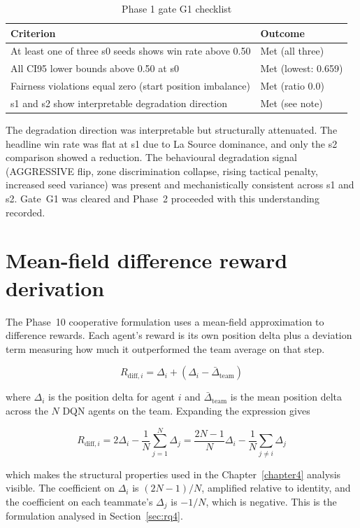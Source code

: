 \begin{appendices}
\begin{table}[htbp]
\centering
\small
\caption{Phase 1 gate G1 checklist}
\label{tab:phase1-gate}
\begin{tabular}{|p{8.5cm}|p{2.0cm}|}
\hline
\textbf{Criterion} & \textbf{Outcome} \\
\hline
At least one of three s0 seeds shows win rate above 0.50 & Met (all three) \\
All CI95 lower bounds above 0.50 at s0 & Met (lowest: 0.659) \\
Fairness violations equal zero (start position imbalance) & Met (ratio 0.0) \\
s1 and s2 show interpretable degradation direction & Met (see note) \\
\hline
\end{tabular}
\end{table}

The degradation direction was interpretable but structurally attenuated. The headline win rate was flat at s1 due to La Source dominance, and only the s2 comparison showed a reduction. The behavioural degradation signal (AGGRESSIVE flip, zone discrimination collapse, rising tactical penalty, increased seed variance) was present and mechanistically consistent across s1 and s2. Gate~G1 was cleared and Phase~2 proceeded with this understanding recorded.

\chapter{Mean-field difference reward derivation}
\label{appendix:difference-rewards}

The Phase~10 cooperative formulation uses a mean-field approximation to difference rewards. Each agent's reward is its own position delta plus a deviation term measuring how much it outperformed the team average on that step.

\[
R_{\text{diff},i} = \Delta_i + (\Delta_i - \bar{\Delta}_{\text{team}})
\]

where $\Delta_i$ is the position delta for agent $i$ and $\bar{\Delta}_{\text{team}}$ is the mean position delta across the $N$ DQN agents on the team. Expanding the expression gives

\[
R_{\text{diff},i} = 2\Delta_i - \frac{1}{N}\sum_{j=1}^{N}\Delta_j = \frac{2N-1}{N}\Delta_i - \frac{1}{N}\sum_{j \neq i}\Delta_j
\]

which makes the structural properties used in the Chapter~\ref{chapter4} analysis visible. The coefficient on $\Delta_i$ is $(2N-1)/N$, amplified relative to identity, and the coefficient on each teammate's $\Delta_j$ is $-1/N$, which is negative. This is the formulation analysed in Section~\ref{sec:rq4}.



\end{appendices}
